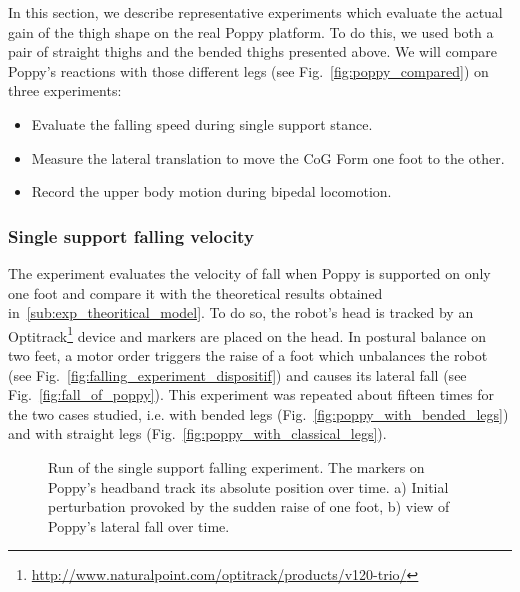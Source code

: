 In this section, we describe representative experiments which evaluate the actual gain of the thigh shape on the real Poppy platform. To do this, we used both a pair of straight thighs and the bended thighs presented above. We will compare Poppy's reactions with those different legs (see Fig.~\ref{fig:poppy_compared}) on three experiments:
\begin{itemize}
    \item Evaluate the falling speed during single support stance.
    \item Measure the lateral translation to move the CoG Form one foot to the other.
    \item Record the upper body motion during bipedal locomotion.
\end{itemize}

\subsubsection{Single support falling velocity} %
\label{ssub:falling_velocity}
The experiment evaluates the velocity of fall  when Poppy  is supported on only one foot and compare it with the theoretical results obtained in~\ref{sub:exp_theoritical_model}. To do so, the robot's head is tracked by an Optitrack\footnote{\url{http://www.naturalpoint.com/optitrack/products/v120-trio/}} device and markers are placed on the head. In postural balance on two feet, a motor order triggers the raise of a foot which unbalances the robot (see Fig.~\ref{fig:falling_experiment_dispositif}) and causes its lateral fall (see Fig.~\ref{fig:fall_of_poppy}). This experiment was repeated about fifteen times for the two cases studied, i.e. with bended legs (Fig.~\ref{fig:poppy_with_bended_legs}) and with straight legs (Fig.~\ref{fig:poppy_with_classical_legs}).

\begin{figure}[h]
\centering
    \hfil
    \caption{Run of the single support falling experiment.
    The markers on Poppy’s headband track its absolute position over time.
     a) Initial perturbation provoked by the sudden raise of one foot, b) view of Poppy’s lateral fall over time.}
    \label{fig:falling_experiment}
\end{figure}

